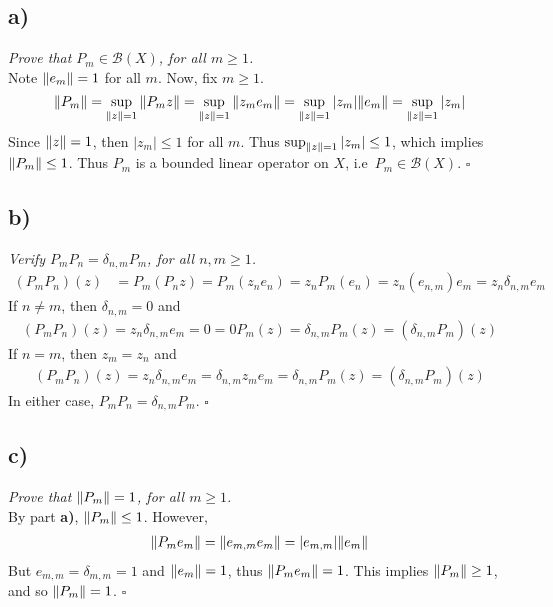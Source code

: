 \documentclass[12pt]{article}
\theoremstyle{plain}
\begin{document}
\subsection*{ a)}
\emph{Prove that $P_m \in \mathcal{B}(X)$, for all $m \geq 1$.} \\

Note $\norm{e_m} = 1$ for all $m$.  Now, fix $m \geq 1$.
\begin{equation}
    \label{norm_equality}
    \norm{P_m} = \sup_{\norm{z}=1}\norm{P_mz} = \sup_{\norm{z}=1}\norm{z_me_m} = \sup_{\norm{z}=1}|z_m|\norm{e_m} = \sup_{\norm{z}=1}|z_m|
\end{equation}
Since $\norm{z} = 1$, then $|z_m| \leq 1$ for all $m$.  Thus $\sup_{\norm{z}=1}|z_m| \leq 1$, which implies $\norm{P_m} \leq 1$.  Thus $P_m$ is a bounded linear operator on $X$, i.e~$P_m \in \mathcal{B}(X)$. \hfill $\square$

\subsection*{ b)}
\emph{Verify $P_m P_n = \delta_{n,m}P_m$, for all $n,m \geq 1$.}
\begin{align*}
    (P_mP_n)(z) &= P_m(P_nz) = P_m(z_ne_n) = z_nP_m(e_n) = z_n(e_{n,m})e_m = z_n\delta_{n,m}e_m
\end{align*}
If $n \neq m$, then $\delta_{n,m} = 0$ and
\begin{align*}
    (P_mP_n)(z) = z_n\delta_{n,m}e_m = 0 = 0P_m(z) = \delta_{n,m}P_m(z) = (\delta_{n,m}P_m)(z)
\end{align*}
If $n = m$, then $z_m = z_n$ and
\begin{align*}
    (P_mP_n)(z) = z_n\delta_{n,m}e_m = \delta_{n,m}z_me_m = \delta_{n,m}P_m(z) = (\delta_{n,m}P_m)(z)
\end{align*}
In either case, $P_mP_n = \delta_{n,m}P_m$. \hfill $\square$

\subsection*{ c)}
\emph{Prove that $\norm{P_m} = 1$, for all $m \geq 1$.} \\

By part \textbf{a)}, $\norm{P_m} \leq 1$.  However,
\begin{align*}
    \norm{P_me_m} = \norm{e_{m,m}e_m} = |e_{m,m}|\norm{e_m}
\end{align*}
But $e_{m,m} = \delta_{m,m} = 1$ and $\norm{e_m} = 1$, thus $\norm{P_me_m} = 1$.  This implies $\norm{P_m} \geq 1$, and so $\norm{P_m} = 1$. \hfill $\square$
\end{document}
